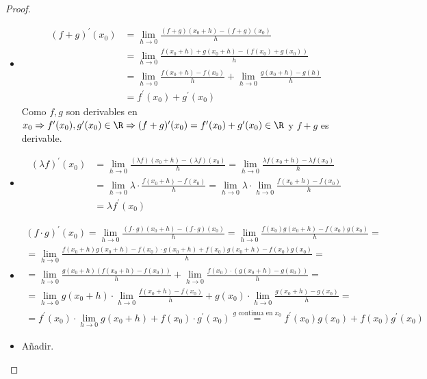 \begin{proof}
	\begin{itemize}
		\item
		      \begin{align*}
			      (f + g)^\prime (x_0) & = \lim\limits_{h  \to 0 } \frac{(f + g)(x_{0} + h) - (f + g)(x_0)}{h} \\&  =  \lim\limits_{h  \to 0 } \frac{f(x_0 + h) + g(x_0 + h) - (f(x_0) + g(x_0))}{h } \\ &  = \lim\limits_{h  \to 0 } \frac{f(x_0 + h) - f(x_0)}{h} + \lim\limits_{h  \to 0 } \frac{g(x_0 + h) - g(h)}{h } \\ & = f^\prime (x_0) + g^\prime (x_0)
		      \end{align*}
		      Como \(f,g \) son derivables en \(x_0 \Rightarrow f^\prime (x_0), g^\prime (x_0) \in \R \Rightarrow (f + g)^\prime (x_0) = f^\prime (x_0) + g^\prime (x_0) \in \R \) y \(f + g \) es derivable.
		\item  
		      \begin{align*}
			      (\lambda f)^\prime (x_0) & = \lim\limits_{h  \to 0 } \frac{(\lambda f)(x_0 + h) - (\lambda f)(x_0)}{h} = \lim\limits_{h  \to 0 } \frac{\lambda f(x_{0} + h ) - \lambda f(x_0)}{h} \\ & = \lim\limits_{h  \to 0 }\lambda \cdot \frac{f(x_0 + h) - f(x_0)}{h} = \lim\limits_{h  \to 0 } \lambda \cdot \lim\limits_{h  \to 0} \frac{f(x_0 + h) - f(x_0)}{h} \\ & = \lambda f^\prime (x_0)
		      \end{align*}
		\item \begin{multline*}
			      (f \cdot g)^\prime (x_0) = \lim\limits_{h  \to 0 } \frac{(f \cdot g)(x_0 + h) - (f \cdot g)(x_0)}{h} = \lim\limits_{h  \to 0 } \frac{f(x_0)g(x_0 + h) - f(x_0)g(x_0)}{h} = \\ = \lim\limits_{h  \to 0 } \frac{f(x_0 + h)g(x_0 + h) - f(x_0) \cdot g(x_0 + h) + f(x_0)g(x_0 + h) - f(x_0)g(x_0)}{h} = \\ = \lim\limits_{h  \to 0 } \frac{g(x_0 + h) (f(x_0 + h) - f(x_0))}{h} + \lim\limits_{h  \to 0 } \frac{f(x_0) \cdot (g(x_0 + h) - g(x_0))}{h} = \\ =  \lim\limits_{h  \to 0 } g(x_0 + h) \cdot \lim\limits_{h   \to 0 } \frac{f(x_0 + h) - f(x_0)}{h} + g(x_0) \cdot \lim\limits_{h  \to 0 } \frac{g(x_0 + h) - g(x_0)}{h } = \\ = f^\prime(x_0) \cdot \lim\limits_{h  \to 0 } g(x_0 + h ) + f(x_0) \cdot g^\prime (x_0) \overset{g\text{ continua en } x_0 }{= } f^\prime (x_0) g(x_0) + f(x_0) g^\prime (x_0)
		      \end{multline*}
		\item Añadir.
	\end{itemize}
\end{proof}
